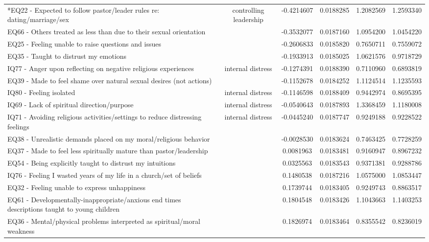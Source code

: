 \documentclass[
  letterpaper,
  DIV=11,
  numbers=noendperiod]{scrreport}
\begin{document}
\begin{longtable}[t]{>{\raggedright\arraybackslash}p{11cm}ccccc}
\endfoot
\bottomrule
\endlastfoot
*EQ22 - Expected to follow pastor/leader rules re: dating/marriage/sex & controlling leadership & -0.4214607 & 0.0188285 & 1.2082569 & 1.2593340\\
EQ66 - Others treated as less than due to their sexual orientation &  & -0.3532077 & 0.0187160 & 1.0954200 & 1.0454220\\
EQ25 - Feeling unable to raise questions and issues &  & -0.2606833 & 0.0185820 & 0.7650711 & 0.7559072\\
EQ35 - Taught to distrust my emotions &  & -0.1933913 & 0.0185025 & 1.0621576 & 0.9718729\\
*IQ77 - Anger upon reflecting on negative religious experiences & internal distress & -0.1274391 & 0.0188390 & 0.7110960 & 0.6893819\\
\addlinespace
EQ39 - Made to feel shame over natural sexual desires (not actions) &  & -0.1152678 & 0.0184252 & 1.1124514 & 1.1235593\\
*IQ80 - Feeling isolated & internal distress & -0.1146598 & 0.0188409 & 0.9442974 & 0.8695395\\
*IQ69 - Lack of spiritual direction/purpose & internal distress & -0.0540643 & 0.0187893 & 1.3368459 & 1.1180008\\
*IQ71 - Avoiding religious activities/settings to reduce distressing feelings & internal distress & -0.0445240 & 0.0187747 & 0.9249188 & 0.9228522\\
EQ38 - Unrealistic demands placed on my moral/religious behavior &  & -0.0028530 & 0.0183624 & 0.7463425 & 0.7728259\\
\addlinespace
EQ37 - Made to feel less spiritually mature than pastor/leadership &  & 0.0081963 & 0.0183481 & 0.9160947 & 0.8967232\\
EQ54 - Being explicitly taught to distrust my intuitions &  & 0.0325563 & 0.0183543 & 0.9371381 & 0.9288786\\
IQ76 - Feeling I wasted years of my life in a church/set of beliefs &  & 0.1480538 & 0.0187216 & 1.0575000 & 1.0853447\\
EQ32 - Feeling unable to express unhappiness &  & 0.1739744 & 0.0183405 & 0.9249743 & 0.8863517\\
EQ61 - Developmentally-inappropriate/anxious end times descriptions taught to young children &  & 0.1804548 & 0.0183426 & 1.1043663 & 1.1403253\\
\addlinespace
EQ36 - Mental/physical problems interpreted as spiritual/moral weakness &  & 0.1826974 & 0.0183464 & 0.8355542 & 0.8236019\\

\end{longtable}
\end{document}
